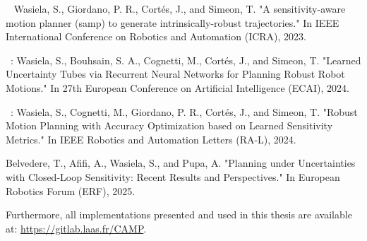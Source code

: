 ~\cite{cSAMP} Wasiela, S., Giordano, P. R., Cortés, J., and Simeon, T. "A sensitivity-aware motion planner (samp) to generate intrinsically-robust trajectories." In IEEE International Conference on Robotics and Automation (ICRA), 2023.

~\cite{cECAI}: Wasiela, S., Bouhsain, S. A., Cognetti, M., Cortés, J., and Simeon, T. "Learned Uncertainty Tubes via Recurrent Neural Networks for Planning Robust Robot Motions." In 27th European Conference on Artificial Intelligence (ECAI), 2024.

~\cite{cRAL}: Wasiela, S., Cognetti, M., Giordano, P. R., Cortés, J., and Simeon, T. "Robust Motion Planning with Accuracy Optimization based on Learned Sensitivity Metrics." In IEEE Robotics and Automation Letters (RA-L), 2024.

Belvedere, T., Afifi, A., Wasiela, S., and Pupa, A. "Planning under Uncertainties with Closed-Loop Sensitivity: Recent Results and Perspectives." In European Robotics Forum (ERF), 2025.

Furthermore, all implementations presented and used in this thesis are available at: \href{https://gitlab.laas.fr/CAMP}{https://gitlab.laas.fr/CAMP}.